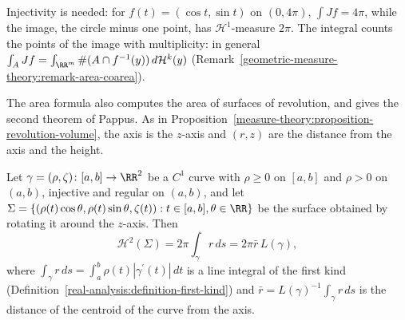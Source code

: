 \begin{counterexample}\label{geometric-measure-theory:counterexample-area-injective}
Injectivity is needed: for $f(t) = (\cos t, \sin t)$ on $(0, 4\pi)$, $\int Jf = 4\pi$, while the image, the circle minus one point, has $\mathcal{H}^1$-measure $2\pi$. The integral counts the points of the
image with multiplicity: in general $\int_AJf = \int_{\RR^m}\#(A \cap f^{-1}(y))\,d\mathcal{H}^k(y)$ (Remark~\ref{geometric-measure-theory:remark-area-coarea}).
\end{counterexample}

The area formula also computes the area of surfaces of revolution, and gives the second theorem of Pappus. As in Proposition~\ref{measure-theory:proposition-revolution-volume}, the axis is the $z$-axis and
$(r, z)$ are the distance from the axis and the height.

\begin{proposition}\label{geometric-measure-theory:proposition-pappus-area}
Let $\gamma = (\rho, \zeta) \colon [a, b] \to \RR^2$ be a $C^1$ curve with $\rho \geq 0$ on $[a, b]$ and $\rho > 0$ on $(a, b)$, injective and regular on $(a, b)$, and let
$\Sigma = \{(\rho(t)\cos\theta, \rho(t)\sin\theta, \zeta(t)) : t \in [a, b], \theta \in \RR\}$ be the surface obtained by rotating it around the $z$-axis. Then
\[
\mathcal{H}^2(\Sigma) = 2\pi\int_\gamma r\,ds = 2\pi\bar r\,L(\gamma),
\]
where $\int_\gamma r\,ds = \int_a^b\rho(t)|\gamma^{\prime}(t)|\,dt$ is a line integral of the first kind (Definition~\ref{real-analysis:definition-first-kind}) and $\bar r = L(\gamma)^{-1}\int_\gamma r\,ds$ is the distance of the
centroid of the curve from the axis.
\end{proposition}

